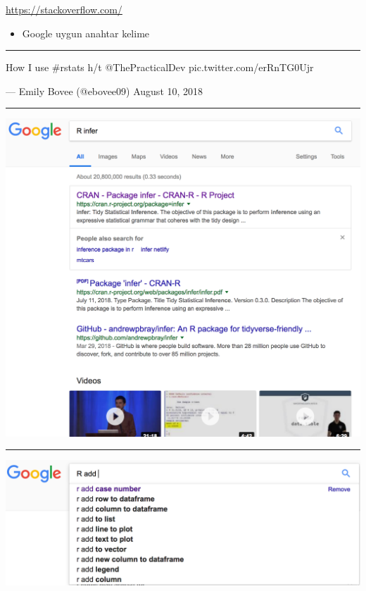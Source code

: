 \documentclass[]{article}
\providecommand{\tightlist}{%
  \setlength{\itemsep}{0pt}\setlength{\parskip}{0pt}}
\begin{document}
\url{https://stackoverflow.com/}

\begin{itemize}
\tightlist
\item
  Google uygun anahtar kelime
\end{itemize}

\begin{center}\rule{0.5\linewidth}{\linethickness}\end{center}

How I use \#rstats h/t @ThePracticalDev pic.twitter.com/erRnTG0Ujr

--- Emily Bovee (@ebovee09) August 10, 2018

\begin{center}\rule{0.5\linewidth}{\linethickness}\end{center}

\includegraphics{figures/Google-package-name.png}

\begin{center}\rule{0.5\linewidth}{\linethickness}\end{center}

\includegraphics{figures/Google-start-with-R.png}
\end{document}
